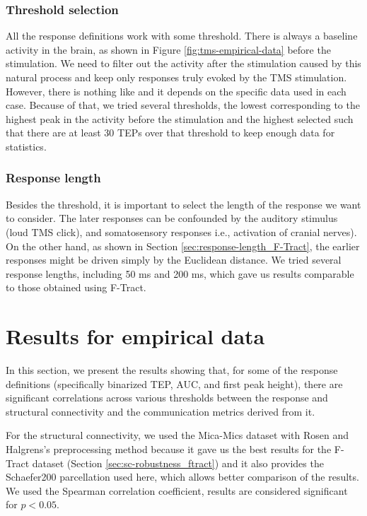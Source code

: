 \subsubsection{Threshold selection}

All the response definitions work with some threshold. There is always a baseline activity in the brain, as shown in Figure \ref{fig:tms-empirical-data} before the stimulation. We need to filter out the activity after the stimulation caused by this natural process and keep only responses truly evoked by the TMS stimulation. However, there is nothing like  and it depends on the specific data used in each case. Because of that, we tried several thresholds, the lowest corresponding to the highest peak in the activity before the stimulation and the highest selected such that there are at least 30 TEPs over that threshold to keep enough data for statistics.

\subsubsection{Response length}

Besides the threshold, it is important to select the length of the response we want to consider. The later responses can be confounded by the auditory stimulus (loud TMS click), and somatosensory responses i.e., activation of cranial nerves). \cite{hernandez-pavon_tms_2023} On the other hand, as shown in Section \ref{sec:response-length_F-Tract}, the earlier responses might be driven simply by the Euclidean distance. We tried several response lengths, including 50 ms and 200 ms, which gave us results comparable to those obtained using F-Tract.

\section{Results for empirical data}\label{sec:results_pytepfit-empirical}

In this section, we present the results showing that, for some of the response definitions (specifically binarized TEP, AUC, and first peak height), there are significant correlations across various thresholds between the response and structural connectivity and the communication metrics derived from it. 

For the structural connectivity, we used the Mica-Mics dataset with Rosen and Halgrens's preprocessing method because it gave us the best results for the F-Tract dataset (Section \ref{sec:sc-robustness_ftract}) and it also provides the Schaefer200 parcellation used here, which allows better comparison of the results. We used the Spearman correlation coefficient, results are considered significant for $p<0.05$.

